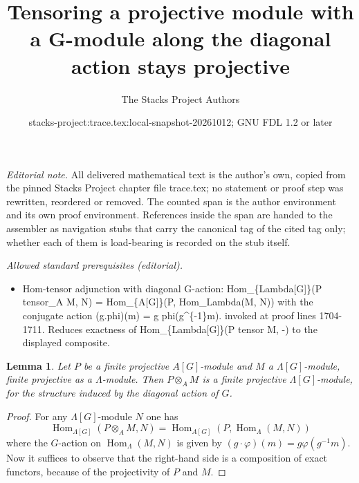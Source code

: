 \documentclass{stacks-project}
\title{Tensoring a projective module with a G-module along the diagonal action stays projective}
\author{The Stacks Project Authors}
\date{stacks-project:trace.tex:local-snapshot-20261012; GNU FDL 1.2 or later}
\theoremstyle{plain}
\newtheorem{lemma}[subsection]{Lemma}
\theoremstyle{definition}
\theoremstyle{remark}
\numberwithin{equation}{subsection}
\def\Hom{\mathop{\mathrm{Hom}}\nolimits}
\begin{document}
\maketitle
\setcounter{subsection}{1}
\noindent\textit{Editorial note.} All delivered mathematical text is the author's own, copied from the pinned Stacks Project chapter file trace.tex; no statement or proof step was rewritten, reordered or removed. The counted span is the author environment and its own proof environment. References inside the span are handed to the assembler as navigation stubs that carry the canonical tag of the cited tag only; whether each of them is load-bearing is recorded on the stub itself.\par\medskip
\noindent\textit{Allowed standard prerequisites (editorial).}\begin{itemize}
\item Hom-tensor adjunction with diagonal G-action: Hom\_\{Lambda[G]\}(P tensor\_A M, N) = Hom\_\{A[G]\}(P, Hom\_Lambda(M, N)) with the conjugate action (g.phi)(m) = g phi(g\textasciicircum{}\{-1\}m). invoked at proof lines 1704-1711. Reduces exactness of Hom\_\{Lambda[G]\}(P tensor M, -) to the displayed composite.
\end{itemize}\medskip
\begin{lemma}
\label{lemma-diagonal-action-projective-module}
Let $P$ be a finite projective $A[G]$-module and $M$ a $\Lambda[G]$-module,
finite projective as a $\Lambda$-module. Then $P \otimes_A M$ is a finite
projective $\Lambda[G]$-module, for the structure induced by the diagonal
action of $G$.
\end{lemma}

\begin{proof}
For any $\Lambda[G]$-module $N$ one has
$$
\Hom_{\Lambda[G]}\left(P \otimes_A M, N\right)= \Hom_{A[G]}\left(P,
\Hom_{\Lambda}(M, N)\right)
$$
where the $G$-action on $\Hom_{\Lambda}(M, N)$ is given by $(g\cdot
\varphi)(m) = g \varphi (g^{-1} m) $. Now it suffices to observe that the
right-hand side is a composition of exact functors, because of the projectivity
of $P$ and $M$.
\end{proof}
\end{document}
